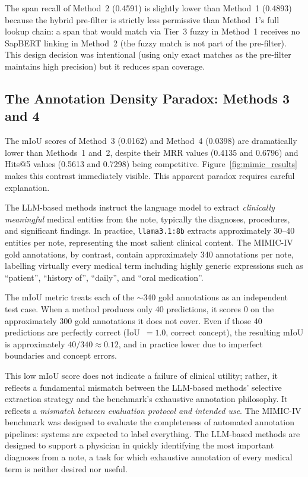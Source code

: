 The span recall of Method~2 (0.4591) is slightly lower than Method~1 (0.4893) because the hybrid pre-filter is strictly less permissive than Method~1's full lookup chain: a span that would match via Tier~3 fuzzy in Method~1 receives no SapBERT linking in Method~2 (the fuzzy match is not part of the pre-filter). This design decision was intentional (using only exact matches as the pre-filter maintains high precision) but it reduces span coverage.

\subsection{The Annotation Density Paradox: Methods 3 and 4}
\label{sec:annotation_density_paradox}

The mIoU scores of Method~3 (0.0162) and Method~4 (0.0398) are dramatically lower than Methods~1 and~2, despite their MRR values (0.4135 and 0.6796) and Hits@5 values (0.5613 and 0.7298) being competitive. Figure~\ref{fig:mimic_results} makes this contrast immediately visible. This apparent paradox requires careful explanation.

The LLM-based methods instruct the language model to extract \textit{clinically meaningful} medical entities from the note, typically the diagnoses, procedures, and significant findings. In practice, \texttt{llama3.1:8b} extracts approximately 30--40 entities per note, representing the most salient clinical content. The MIMIC-IV gold annotations, by contrast, contain approximately 340 annotations per note, labelling virtually every medical term including highly generic expressions such as ``patient'', ``history of'', ``daily'', and ``oral medication''.

The mIoU metric treats each of the $\sim$340 gold annotations as an independent test case. When a method produces only 40 predictions, it scores 0 on the approximately 300 gold annotations it does not cover. Even if those 40 predictions are perfectly correct (IoU~$=1.0$, correct concept), the resulting mIoU is approximately $40/340 \approx 0.12$, and in practice lower due to imperfect boundaries and concept errors.

This low mIoU score does not indicate a failure of clinical utility; rather, it reflects a fundamental mismatch between the LLM-based methods' selective extraction strategy and the benchmark's exhaustive annotation philosophy. It reflects a \textit{mismatch between evaluation protocol and intended use}. The MIMIC-IV benchmark was designed to evaluate the completeness of automated annotation pipelines: systems are expected to label everything. The LLM-based methods are designed to support a physician in quickly identifying the most important diagnoses from a note, a task for which exhaustive annotation of every medical term is neither desired nor useful.

